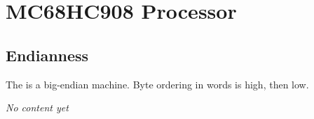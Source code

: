 \chapter{MC68HC908 Processor}
\label{processor:MC68HC908}
\section{Endianness}

The  is a big-endian machine. Byte ordering in words is high, then low.

\emph{No content yet}